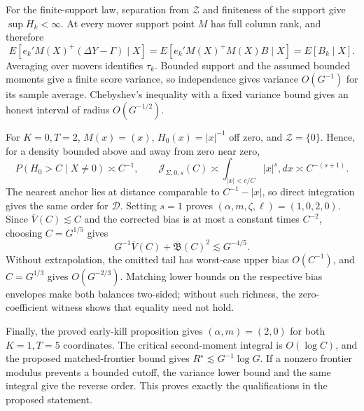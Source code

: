 For the finite-support law, separation from \(\mathcal Z\) and finiteness of the support give \(\sup H_k<\infty\). At every mover support point \(M\) has full column rank, and therefore
\[
E[e_k'M(X)^+(\Delta Y-\Gamma)\mid X]
=E[e_k'M(X)^+M(X)B\mid X]
=E[B_k\mid X].
\]
Averaging over movers identifies \(\tau_k\). Bounded support and the assumed bounded moments give a finite score variance, so independence gives variance \(O(G^{-1})\) for its sample average. Chebyshev's inequality with a fixed variance bound gives an honest interval of radius \(O(G^{-1/2})\).

For \(K=0,T=2\), \(M(x)=(x)\), \(H_0(x)=|x|^{-1}\) off zero, and \(\mathcal Z=\{0\}\). Hence, for a density bounded above and away from zero near zero,
\[
P(H_0>C\mid X\ne0)\asymp C^{-1},
\qquad
\mathcal J_{\Sigma,0,s}(C)
\asymp\int_{|x|<c/C}|x|^s,dx
\asymp C^{-(s+1)}.
\]
The nearest anchor lies at distance comparable to \(C^{-1}-|x|\), so direct integration gives the same order for \(\mathcal D\). Setting \(s=1\) proves \((\alpha,m,\zeta,\ell)=(1,0,2,0)\). Since \(\overline V(C)\lesssim C\) and the corrected bias is at most a constant times \(C^{-2}\), choosing \(C=G^{1/5}\) gives
\[
G^{-1}\overline V(C)+\overline{\mathfrak B}(C)^2
\lesssim G^{-4/5}.
\]
Without extrapolation, the omitted tail has worst-case upper bias \(O(C^{-1})\), and \(C=G^{1/3}\) gives \(O(G^{-2/3})\). Matching lower bounds on the respective bias envelopes make both balances two-sided; without such richness, the zero-coefficient witness shows that equality need not hold.

Finally, the proved early-kill proposition gives \((\alpha,m)=(2,0)\) for both \(K=1,T=5\) coordinates. The critical second-moment integral is \(O(\log C)\), and the proposed matched-frontier bound gives \(R^\star\lesssim G^{-1}\log G\). If a nonzero frontier modulus prevents a bounded cutoff, the variance lower bound and the same integral give the reverse order. This proves exactly the qualifications in the proposed statement.